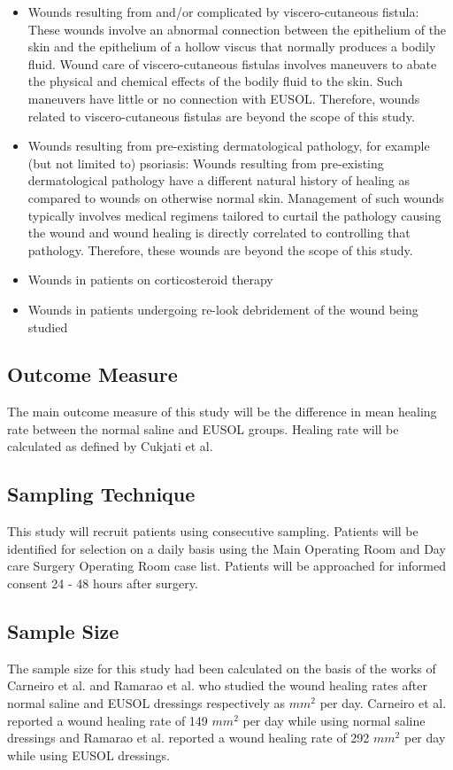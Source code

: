 \documentclass{article}
\begin{document}
\begin{itemize}
\item Wounds resulting from and/or complicated by viscero-cutaneous fistula: These wounds involve an abnormal connection between the epithelium of the skin and   the epithelium of a hollow viscus that normally produces a bodily fluid. Wound   care of viscero-cutaneous fistulas involves maneuvers to abate the physical and chemical effects of the bodily fluid to the skin. Such maneuvers have little or no connection with EUSOL. Therefore, wounds related to viscero-cutaneous fistulas are beyond the scope of this study.
\item Wounds resulting from pre-existing dermatological pathology, for example (but not limited to) psoriasis: Wounds resulting from pre-existing dermatological pathology have a different natural history of healing as compared to wounds on otherwise normal skin. Management of such wounds typically involves medical regimens tailored to curtail the pathology causing the wound and wound healing is directly correlated to controlling that pathology. Therefore, these wounds are beyond the scope of this study. 
\item Wounds in patients on corticosteroid therapy
\item Wounds in patients undergoing re-look debridement of the wound being studied
\end{itemize}

\subsection{Outcome Measure}
The main outcome measure of this study will be the difference in mean healing
rate between the normal saline and EUSOL groups. Healing rate will be calculated
as defined by Cukjati et al.\cite{Cukjati_2001}

\subsection{Sampling Technique}
This study will recruit patients using consecutive sampling. Patients will be
identified for selection on a daily basis using the Main Operating Room and Day
care Surgery Operating Room case list. Patients will be approached for informed
consent 24 - 48 hours after surgery.

\subsection{Sample Size}
The sample size for this study had been calculated on the basis of the works of
Carneiro et al. and Ramarao et al. who studied the wound healing rates after
normal saline and EUSOL dressings respectively as $mm^2$ per day. 
Carneiro et al. reported a wound healing rate of 149 $mm^2$ per day while using normal saline
dressings and Ramarao et al. reported a wound healing rate of 292 $mm^2$ per day
while using EUSOL dressings.
\end{document}
